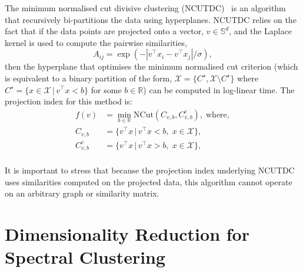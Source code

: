 \documentclass{book}
\def\R{\mathbb{R}}
\begin{document}
The minimum normalised cut divisive clustering
(NCUTDC)~\cite{Hofmeyr2017} is an algorithm that recursively bi-partitions
the data using hyperplanes. 
%
%
NCUTDC relies on the fact that if the data points are projected onto a vector, $v \in \mathbb{S}^d$,
and the Laplace kernel is used to compute the pairwise similarities, 
%
\[A_{ij} = \exp\left( -\left|v^\top x_i - v^\top x_j\right|/\sigma \right), \]
%
then the hyperplane that optimises the minimum normalised cut criterion
(which is equivalent to a binary partition of the form,
$\mathcal{X} = \{C^\star, \mathcal{X}\setminus C^\star\}$ where
$C^\star = \{x \in \mathcal{X} \,|\, v^\top x < b\}$ for some $b \in \R$)
%
can be computed in log-linear time.
%
%
%
The projection index for this method is:
%
\begin{align*}
%
f(v) & = \min_{b \in \R} \mathrm{NCut}\left( C_{v,b},  C_{v,b}^c \right), \;
\textrm{where},\\
%
C_{v,b} & = \{ v^\top x \,|\, v^\top x < b, \; x \in \mathcal{X}\}, \\
%
C^c_{v,b} & = \{ v^\top x \,|\, v^\top x > b,\; x \in \mathcal{X}\}, \\
%
\end{align*}

\noindent
%
It is important to stress that because the projection index underlying NCUTDC
uses similarities computed on the projected data, this algorithm cannot operate
on an arbitrary graph or similarity matrix.




\section{Dimensionality Reduction for Spectral Clustering}
\end{document}
